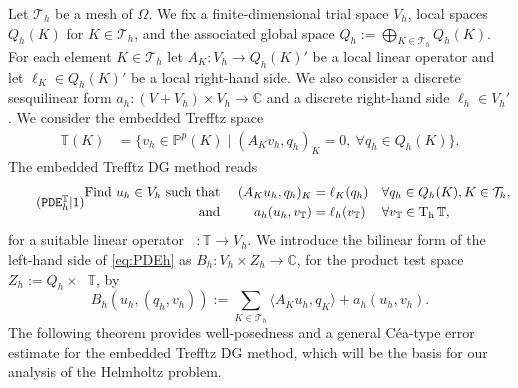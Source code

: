 \documentclass[11pt]{article}
\theoremstyle{definition}
\theoremstyle{plain}
\newcommand{\Th}{{\calT_h}}
\newcommand{\AK}{{A_K}}
\newcommand{\QKh}{Q_h(K)}
\newcommand{\Qh}{Q_h}
\newcommand{\Bh}{{B_h}}
\DeclareMathOperator{\tch}{T_h}
\newcommand{\inner}[1]{( #1 )}
\newcommand{\IC}{\mathbb{C}}
\newcommand{\IP}{\mathbb{P}}
\newcommand{\IT}{\mathbb{T}}
\newcommand{\ITh}{\mathbb{T}}
\newcommand{\calT}{\mathcal{T}}
\begin{document}
Let $\Th$ be a mesh of $\Omega$. We fix a finite-dimensional trial space $V_h$, local spaces $\QKh$ for $K\in\Th$, and the associated global space
$
\Qh := \bigoplus_{K\in\Th}\QKh.
$
For each element $K\in\Th$ let $\AK:V_h\to\QKh'$ be a local linear operator and let $\ell_K\in\QKh'$ be a local right-hand side. 
We also consider a discrete sesquilinear form $a_h:(V+V_h)\times V_h\to\IC$ and a discrete right-hand side $\ell_h\in V_h'$.
We consider the embedded Trefftz space
\begin{align*}
    \ITh(K)&= \{v_h \in \IP^p(K) \mid \inner{\AK  v_h, q_h}_K=0,\ \forall q_h\in \QKh \}.
\end{align*}
The embedded Trefftz DG method reads
\begin{equation}\label{eq:PDEh}
\addtocounter{equation}{1} \tag{$\texttt{PDE}^{\IT}_h|\theequation$}
\begin{alignedat}{3}
    \text{Find } u_h \in V_h 
    \text{ such that } &&\quad\inner{\AK  u_h, q_h}_K&=\ell_K(q_h) &&\quad \forall q_h\in \QKh, K\in\Th,
    \\ \text{ and }  && \quad a_h(u_h,v_{\IT})&=\ell_h(v_{\IT}) &&\quad \forall v_{\IT}\in \tch \ITh,
\end{alignedat}
\end{equation}
for a suitable linear operator $\tch:\IT \to V_h$.
We introduce the bilinear form of the left-hand side of \eqref{eq:PDEh} as $\Bh:V_h\times Z_h\to\IC$, for the product test space $Z_h := \Qh \times \tch\ITh$, by
\[
  \Bh(u_h,(q_h,v_h)) := \sum_{K\in\Th}\langle \AK u_h,q_K\rangle + a_h(u_h,v_h).
\]
The following theorem provides well-posedness and a general C\'ea-type error estimate for the embedded Trefftz DG method, which will be the basis for our analysis of the Helmholtz problem.
\end{document}
